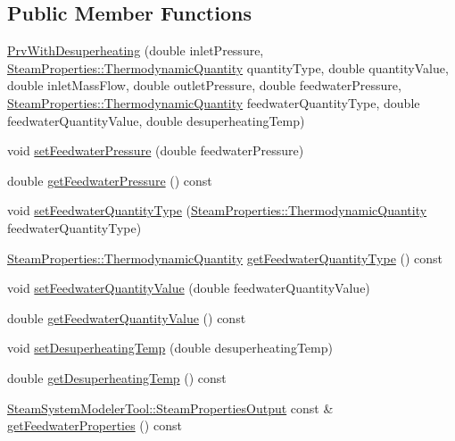 \subsection*{Public Member Functions}
\begin{DoxyCompactItemize}
\item 
\hyperlink{class_prv_with_desuperheating_adfd7f6866e8b953dcc41e51bb5b31b58}{Prv\+With\+Desuperheating} (double inlet\+Pressure, \hyperlink{class_steam_properties_ae0294bedf7d178c2d8fb6aed0f62fbff}{Steam\+Properties\+::\+Thermodynamic\+Quantity} quantity\+Type, double quantity\+Value, double inlet\+Mass\+Flow, double outlet\+Pressure, double feedwater\+Pressure, \hyperlink{class_steam_properties_ae0294bedf7d178c2d8fb6aed0f62fbff}{Steam\+Properties\+::\+Thermodynamic\+Quantity} feedwater\+Quantity\+Type, double feedwater\+Quantity\+Value, double desuperheating\+Temp)
\item 
void \hyperlink{class_prv_with_desuperheating_a8494ebf87e5bd834f621b0c7ca257fbe}{set\+Feedwater\+Pressure} (double feedwater\+Pressure)
\item 
double \hyperlink{class_prv_with_desuperheating_a260bbe19272694af509fb408a821b041}{get\+Feedwater\+Pressure} () const
\item 
void \hyperlink{class_prv_with_desuperheating_a3efaf028d1e6b8349a9e064605cc8d7a}{set\+Feedwater\+Quantity\+Type} (\hyperlink{class_steam_properties_ae0294bedf7d178c2d8fb6aed0f62fbff}{Steam\+Properties\+::\+Thermodynamic\+Quantity} feedwater\+Quantity\+Type)
\item 
\hyperlink{class_steam_properties_ae0294bedf7d178c2d8fb6aed0f62fbff}{Steam\+Properties\+::\+Thermodynamic\+Quantity} \hyperlink{class_prv_with_desuperheating_aa6901e00ecf819d95f79c20ef1775876}{get\+Feedwater\+Quantity\+Type} () const
\item 
void \hyperlink{class_prv_with_desuperheating_afc17940f7d61898eda1bb4a6f1fea8c3}{set\+Feedwater\+Quantity\+Value} (double feedwater\+Quantity\+Value)
\item 
double \hyperlink{class_prv_with_desuperheating_a8645a251b2e77e434a8bc51dfedcad69}{get\+Feedwater\+Quantity\+Value} () const
\item 
void \hyperlink{class_prv_with_desuperheating_ade1b153c495efb451006b3c054ff386e}{set\+Desuperheating\+Temp} (double desuperheating\+Temp)
\item 
double \hyperlink{class_prv_with_desuperheating_af334a9ff9a14d110cb2851a76d5d84fb}{get\+Desuperheating\+Temp} () const
\item 
\hyperlink{struct_steam_system_modeler_tool_1_1_steam_properties_output}{Steam\+System\+Modeler\+Tool\+::\+Steam\+Properties\+Output} const  \& \hyperlink{class_prv_with_desuperheating_a8f4594109bda9bc4030c23cee9841fa8}{get\+Feedwater\+Properties} () const

\end{DoxyCompactItemize}
